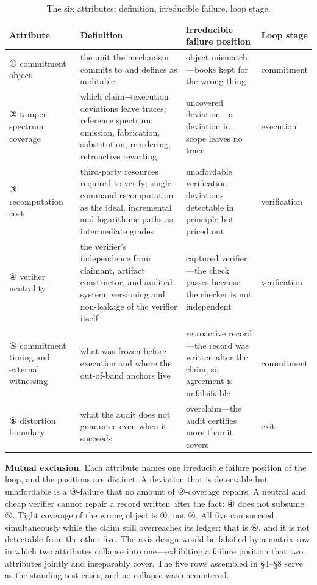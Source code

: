 \documentclass[11pt,a4paper]{article}
\begin{document}
\begin{table}[htbp]
\centering
\footnotesize
\setlength{\tabcolsep}{3.5pt}
\renewcommand{\arraystretch}{1.18}
\begin{tabularx}{0.985\textwidth}{>{\raggedright\arraybackslash}p{} >{\raggedright\arraybackslash}X >{\raggedright\arraybackslash}p{} >{\raggedright\arraybackslash}p{}}
\toprule
\textbf{Attribute} & \textbf{Definition} & \textbf{Irreducible failure position} & \textbf{Loop stage} \\
\midrule
① commitment object & the unit the mechanism commits to and defines as auditable & object mismatch—books kept for the wrong thing & commitment \\
② tamper-spectrum coverage & which claim→execution deviations leave traces; reference spectrum: omission, fabrication, substitution, reordering, retroactive rewriting & uncovered deviation—a deviation in scope leaves no trace & execution \\
③ recomputation cost & third-party resources required to verify; single-command recomputation as the ideal, incremental and logarithmic paths as intermediate grades & unaffordable verification—deviations detectable in principle but priced out & verification \\
④ verifier neutrality & the verifier's independence from claimant, artifact constructor, and audited system; versioning and non-leakage of the verifier itself & captured verifier—the check passes because the checker is not independent & verification \\
⑤ commitment timing and external witnessing & what was frozen before execution and where the out-of-band anchors live & retroactive record—the record was written after the claim, so agreement is unfalsifiable & commitment \\
⑥ distortion boundary & what the audit does not guarantee even when it succeeds & overclaim—the audit certifies more than it covers & exit \\
\bottomrule
\end{tabularx}
\caption{The six attributes: definition, irreducible failure, loop stage.}
\label{tab:T2}
\end{table}

\textbf{Mutual exclusion.} Each attribute names one irreducible failure position of the loop, and the positions are distinct. A deviation that is detectable but unaffordable is a ③-failure that no amount of ②-coverage repairs. A neutral and cheap verifier cannot repair a record written after the fact: ④ does not subsume ⑤. Tight coverage of the wrong object is ①, not ②. All five can succeed simultaneously while the claim still overreaches its ledger; that is ⑥, and it is not detectable from the other five. The axis design would be falsified by a matrix row in which two attributes collapse into one—exhibiting a failure position that two attributes jointly and inseparably cover. The five rows assembled in §4–§8 serve as the standing test cases, and no collapse was encountered.
\end{document}
